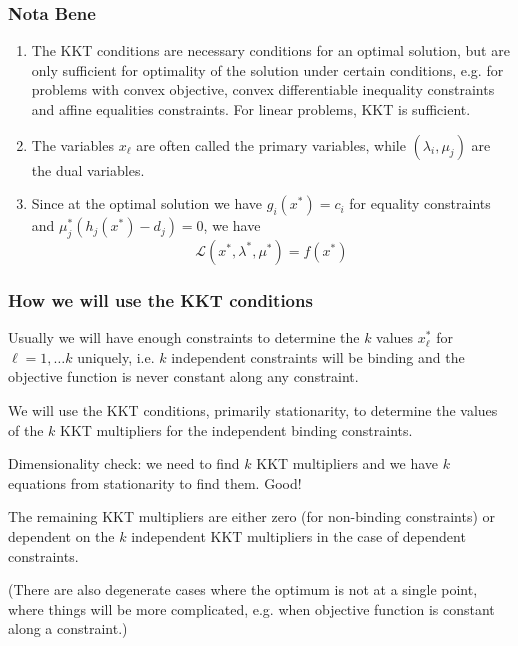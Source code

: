 \documentclass[10pt,aspectratio=169,dvipsnames]{beamer}
\def\l{\lambda}
\def\m{\mu}
\def\cL{\mathcal{L}}
\let\olditem\item
\renewcommand{\item}{%
\olditem\vspace{5pt}}
\begin{document}
\begin{frame}
  \frametitle{Nota Bene}

  \begin{enumerate}
  \item The KKT conditions are necessary conditions for an optimal solution, but are only \alert{sufficient} for optimality
    of the solution under certain conditions, e.g. for problems with convex objective, convex differentiable inequality constraints and affine equalities constraints. For linear problems, KKT is sufficient.
    \item The variables $x_\ell$  are often called the \alert{primary variables}, while $(\l_i,\m_j)$ are the \alert{dual variables}.
  \item Since at the optimal solution we have $g_i(x^*) = c_i$ for equality constraints and
    $\m_j^*(h_j(x^*) - d_j) = 0$, we have
    \begin{equation*}
         \cL(x^*,\l^*,\m^*) = f(x^*)
    \end{equation*}


  \end{enumerate}

\end{frame}


\begin{frame}
  \frametitle{How we will use the KKT conditions}

  Usually we will have enough constraints to determine the $k$ values
  $x_\ell^*$ for $\ell=1,\dots k$ uniquely, i.e. $k$ independent constraints will be binding and the objective function is never constant along any constraint.

  We will use the KKT conditions, primarily stationarity, to determine
  the values of the $k$ KKT multipliers for the independent binding constraints.

  \alert{Dimensionality check}: we need to find $k$ KKT multipliers and we have $k$ equations from stationarity to find them. Good!

  The remaining KKT multipliers are either zero (for non-binding
  constraints) or dependent on the $k$ independent KKT multipliers in the case of dependent constraints.

  (There are also degenerate cases where the optimum is not at a single point, where things will be more complicated, e.g. when objective function is constant along a constraint.)

\end{frame}
\end{document}
